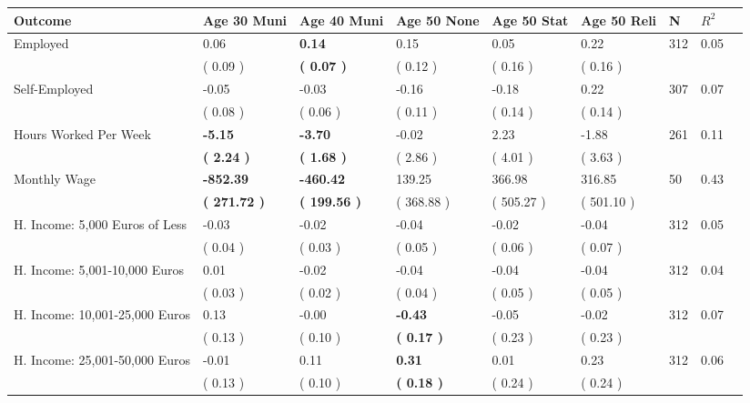 \begin{tabular}{L{6.2cm} C{1.8cm} C{1.8cm} C{1.8cm} C{1.8cm} C{1.8cm} C{1.8cm} C{0.3cm} C{0.3cm}}
\toprule
 \textbf{Outcome} & \textbf{Age 30 Muni} & \textbf{Age 40 Muni} & \textbf{Age 50 None} & \textbf{Age 50 Stat} & \textbf{Age 50 Reli} & \textbf{N} & \textbf{$ R^2$} \\
\midrule
Employed &      0.06 & \textbf{     0.14} &      0.15 &      0.05 &      0.22  & 312 &       0.05 \\ 
 & (     0.09 ) & \textbf{(     0.07 )} & (     0.12 ) & (     0.16 ) & (     0.16 )  & \\
Self-Employed &     -0.05 &     -0.03 &     -0.16 &     -0.18 &      0.22  & 307 &       0.07 \\ 
 & (     0.08 ) & (     0.06 ) & (     0.11 ) & (     0.14 ) & (     0.14 )  & \\
Hours Worked Per Week & \textbf{    -5.15} & \textbf{    -3.70} &     -0.02 &      2.23 &     -1.88  & 261 &       0.11 \\ 
 & \textbf{(     2.24 )} & \textbf{(     1.68 )} & (     2.86 ) & (     4.01 ) & (     3.63 )  & \\
Monthly Wage & \textbf{  -852.39} & \textbf{  -460.42} &    139.25 &    366.98 &    316.85  & 50 &       0.43 \\ 
 & \textbf{(   271.72 )} & \textbf{(   199.56 )} & (   368.88 ) & (   505.27 ) & (   501.10 )  & \\
H. Income: 5,000 Euros of Less &     -0.03 &     -0.02 &     -0.04 &     -0.02 &     -0.04  & 312 &       0.05 \\ 
 & (     0.04 ) & (     0.03 ) & (     0.05 ) & (     0.06 ) & (     0.07 )  & \\
H. Income: 5,001-10,000 Euros &      0.01 &     -0.02 &     -0.04 &     -0.04 &     -0.04  & 312 &       0.04 \\ 
 & (     0.03 ) & (     0.02 ) & (     0.04 ) & (     0.05 ) & (     0.05 )  & \\
H. Income: 10,001-25,000 Euros &      0.13 &     -0.00 & \textbf{    -0.43} &     -0.05 &     -0.02  & 312 &       0.07 \\ 
 & (     0.13 ) & (     0.10 ) & \textbf{(     0.17 )} & (     0.23 ) & (     0.23 )  & \\
H. Income: 25,001-50,000 Euros &     -0.01 &      0.11 & \textbf{     0.31} &      0.01 &      0.23  & 312 &       0.06 \\ 
 & (     0.13 ) & (     0.10 ) & \textbf{(     0.18 )} & (     0.24 ) & (     0.24 )  & \\

\end{tabular}
